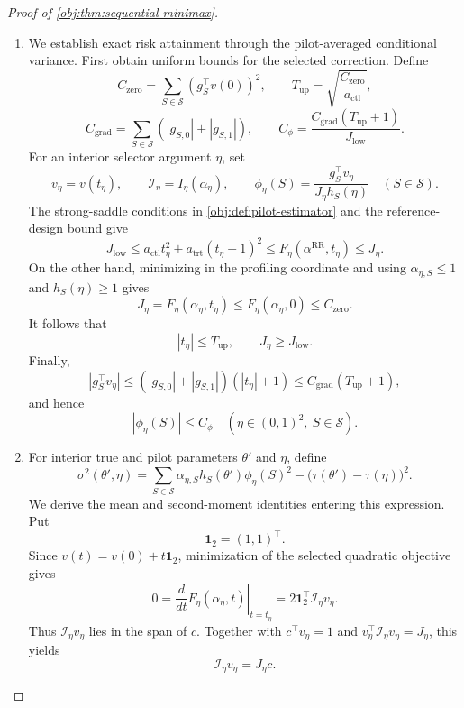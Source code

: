 \begin{proof}[Proof of \cref{obj:thm:sequential-minimax}]
\begin{enumerate}
\item
We establish exact risk attainment through the pilot-averaged conditional variance. First obtain uniform bounds for the selected correction. Define
\[
C_{\mathrm{zero}}
=
\sum_{S\in\mathcal S}(g_S^\top v(0))^2,
\qquad
T_{\mathrm{up}}
=
\sqrt{\frac{C_{\mathrm{zero}}}{a_{\mathrm{ctl}}}},
\]
\[
C_{\mathrm{grad}}
=
\sum_{S\in\mathcal S}(|g_{S,0}|+|g_{S,1}|),
\qquad
C_\phi
=
\frac{C_{\mathrm{grad}}(T_{\mathrm{up}}+1)}
{J_{\mathrm{low}}}.
\]
For an interior selector argument \(\eta\), set
\[
v_\eta=v(t_\eta),
\qquad
\mathcal I_\eta=I_\eta(\alpha_\eta),
\qquad
\phi_\eta(S)=
\frac{g_S^\top v_\eta}{J_\eta h_S(\eta)}
\quad(S\in\mathcal S).
\]
The strong-saddle conditions in \cref{obj:def:pilot-estimator} and the reference-design bound give
\[
J_{\mathrm{low}}
\le
a_{\mathrm{ctl}}t_\eta^2+a_{\mathrm{trt}}(t_\eta+1)^2
\le
F_\eta(\alpha^{\mathrm{RR}},t_\eta)
\le
J_\eta.
\]
On the other hand, minimizing in the profiling coordinate and using
\(\alpha_{\eta,S}\le1\) and \(h_S(\eta)\ge1\) gives
\[
J_\eta
=
F_\eta(\alpha_\eta,t_\eta)
\le F_\eta(\alpha_\eta,0)
\le C_{\mathrm{zero}}.
\]
It follows that
\[
|t_\eta|\le T_{\mathrm{up}},
\qquad
J_\eta\ge J_{\mathrm{low}}.
\]
Finally,
\[
|g_S^\top v_\eta|
\le
(|g_{S,0}|+|g_{S,1}|)(|t_\eta|+1)
\le
C_{\mathrm{grad}}(T_{\mathrm{up}}+1),
\]
and hence
\[
|\phi_\eta(S)|\le C_\phi
\quad(\eta\in(0,1)^2,\ S\in\mathcal S).
\]

\item
For interior true and pilot parameters \(\theta'\) and \(\eta\), define
\[
\sigma^2(\theta',\eta)
=
\sum_{S\in\mathcal S}
\alpha_{\eta,S}h_S(\theta')\phi_\eta(S)^2
-
\bigl(\tau(\theta')-\tau(\eta)\bigr)^2.
\]
We derive the mean and second-moment identities entering this expression. Put
\[
\mathbf{1}_2=(1,1)^\top.
\]
Since \(v(t)=v(0)+t\mathbf{1}_2\), minimization of the selected quadratic objective gives
\[
0=
\left.\frac{d}{dt}F_\eta(\alpha_\eta,t)\right|_{t=t_\eta}
=
2\mathbf{1}_2^\top\mathcal I_\eta v_\eta.
\]
Thus \(\mathcal I_\eta v_\eta\) lies in the span of \(c\). Together with
\(c^\top v_\eta=1\) and \(v_\eta^\top\mathcal I_\eta v_\eta=J_\eta\), this yields
\[
\mathcal I_\eta v_\eta=J_\eta c.
\]


\end{enumerate}
\end{proof}
